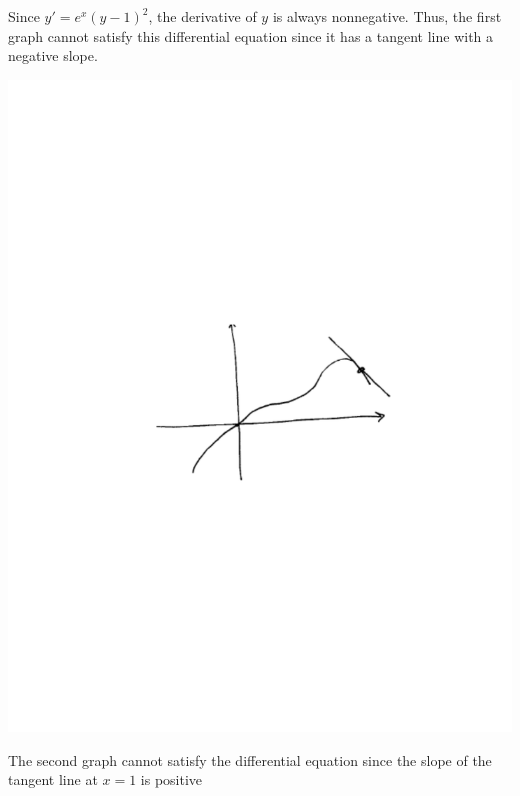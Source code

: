 \documentclass[noinstructornotes]{ximera}
\begin{document}
\begin{problem}
\begin{problem}
	\begin{freeResponse}
	Since $y' = e^x (y-1)^2$, the derivative of $y$ is always nonnegative.  
	Thus, the first graph cannot satisfy this differential equation since it has a tangent line with a negative slope.
	
	\begin{image}
	\includegraphics[trim= 170 300 190 310, scale=1]{Figure8-1-2.pdf}	
	\end{image}
	
	The second graph cannot satisfy the differential equation since the slope of the tangent line at $x=1$ is positive
	

\end{freeResponse}
\end{problem}
\end{problem}
\end{document}
